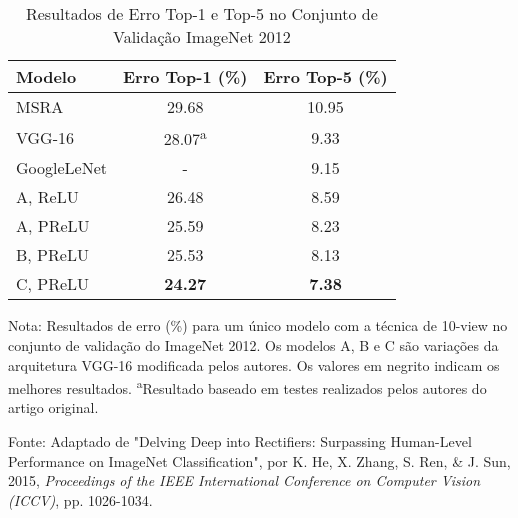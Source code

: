 \begin{table}[ht]
    \centering
    \begin{threeparttable}
        \caption{Resultados de Erro Top-1 e Top-5 no Conjunto de Validação ImageNet 2012}
        \label{tab:prelu-desempenho}
        \begin{tabular}{lcc}
            \toprule
            \textbf{Modelo} & \textbf{Erro Top-1 (\%)} & \textbf{Erro Top-5 (\%)} \\
            \midrule
            
            MSRA       & 29.68 & 10.95 \\
            VGG-16     & 28.07\textsuperscript{a} & 9.33 \\
            GoogleLeNet&  -    & 9.15 \\
            \addlinespace
            A, ReLU    & 26.48 & 8.59 \\
            A, PReLU   & 25.59 & 8.23 \\
            B, PReLU   & 25.53 & 8.13 \\
            C, PReLU   & \textbf{24.27} & \textbf{7.38} \\ 
            
            \bottomrule
        \end{tabular}
        
        \begin{tablenotes}[para]
            \small
            \item[] Nota: Resultados de erro (\%) para um único modelo com a técnica de 10-view no conjunto de validação do ImageNet 2012. Os modelos A, B e C são variações da arquitetura VGG-16 modificada pelos autores. Os valores em negrito indicam os melhores resultados. \textsuperscript{a}Resultado baseado em testes realizados pelos autores do artigo original.
            \item[] Fonte: Adaptado de "Delving Deep into Rectifiers: Surpassing Human-Level Performance on ImageNet Classification", por K. He, X. Zhang, S. Ren, \& J. Sun, 2015, \textit{Proceedings of the IEEE International Conference on Computer Vision (ICCV)}, pp. 1026-1034.
        \end{tablenotes}

    \end{threeparttable}
\end{table}

